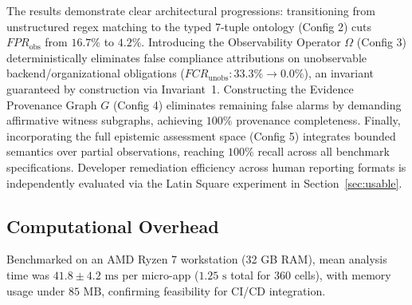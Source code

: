 The results demonstrate clear architectural progressions: transitioning from unstructured regex matching to the typed 7-tuple ontology (Config 2) cuts $FPR_{\text{obs}}$ from $16.7\%$ to $4.2\%$. Introducing the Observability Operator $\Omega$ (Config 3) deterministically eliminates false compliance attributions on unobservable backend/organizational obligations ($FCR_{\text{unobs}}: 33.3\% \rightarrow 0.0\%$), an invariant guaranteed by construction via Invariant~1. Constructing the Evidence Provenance Graph $G$ (Config 4) eliminates remaining false alarms by demanding affirmative witness subgraphs, achieving $100\%$ provenance completeness. Finally, incorporating the full epistemic assessment space (Config 5) integrates bounded semantics over partial observations, reaching $100\%$ recall across all benchmark specifications. Developer remediation efficiency across human reporting formats is independently evaluated via the Latin Square experiment in Section~\ref{sec:usable}.

\subsection{Computational Overhead}
\label{sec:benchmark:overhead}

Benchmarked on an AMD Ryzen 7 workstation (32 GB RAM), mean analysis time was $41.8 \pm 4.2 \text{ ms}$ per micro-app ($1.25 \text{ s}$ total for 360 cells), with memory usage under $85 \text{ MB}$, confirming feasibility for CI/CD integration.
